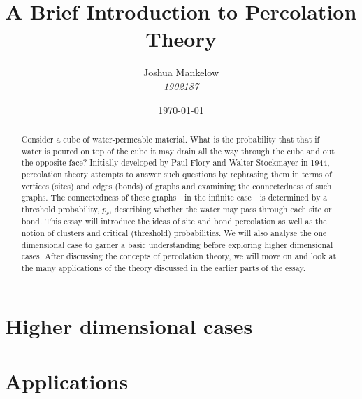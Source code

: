 \documentclass[a4paper,11pt]{article}
\title{\textbf{ A Brief Introduction to Percolation Theory }}
\author{Joshua Mankelow \\ \textit{1902187}}
\date{\today}
\theoremstyle{plain} %
\theoremstyle{definition} %
\theoremstyle{remark} %
\begin{document}
  
\maketitle


\begin{abstract}
  Consider a cube of water-permeable material. What is the probability that that if water is poured on top of the cube it may drain all the way through
  the cube and out the opposite face? 
  Initially developed by Paul Flory and Walter Stockmayer in 1944, percolation theory attempts to answer such questions by rephrasing them
  in terms of vertices (sites) and edges (bonds) of graphs and examining the connectedness of such graphs. The connectedness of these graphs---in the infinite case---is
  determined by a threshold probability, $p_c$, describing whether the water may pass through each site or bond.
  This essay will introduce the ideas of site and bond percolation as well as the notion of clusters and critical (threshold) probabilities.
  We will also analyse the one dimensional case to garner a basic understanding before exploring higher dimensional cases. After discussing the concepts of percolation theory, we will move on and look at the many applications of the
  theory discussed in the earlier parts of the essay.
\end{abstract}

\newpage

\tableofcontents

\newpage





\section{Higher dimensional cases}

\section{Applications}



\end{document}
